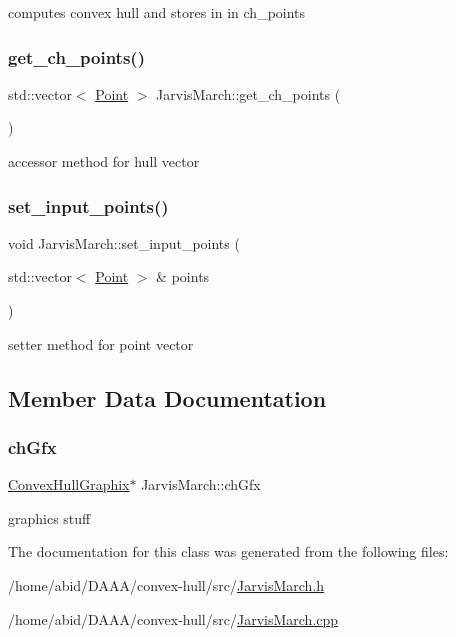 computes convex hull and stores in in ch\+\_\+points \mbox{\label{class_jarvis_march_ae07fa1d85d5be1e876baa79a0a15e6bf}} 
\subsubsection{\texorpdfstring{get\_ch\_points()}{get\_ch\_points()}}
{\footnotesize\ttfamily std\+::vector$<$ \mbox{\hyperlink{class_point}{Point}} $>$ Jarvis\+March\+::get\+\_\+ch\+\_\+points (\begin{DoxyParamCaption}{ }\end{DoxyParamCaption})}

accessor method for hull vector \mbox{\label{class_jarvis_march_a53ff2d27872fa533efb2ce222a9dde88}} 
\subsubsection{\texorpdfstring{set\_input\_points()}{set\_input\_points()}}
{\footnotesize\ttfamily void Jarvis\+March\+::set\+\_\+input\+\_\+points (\begin{DoxyParamCaption}\item[{std\+::vector$<$ \mbox{\hyperlink{class_point}{Point}} $>$ \&}]{points }\end{DoxyParamCaption})}

setter method for point vector 

\subsection{Member Data Documentation}
\mbox{\label{class_jarvis_march_a6fb3af00dde6115578e1accc2e8b953c}} 
\subsubsection{\texorpdfstring{chGfx}{chGfx}}
{\footnotesize\ttfamily \mbox{\hyperlink{class_convex_hull_graphix}{Convex\+Hull\+Graphix}}$\ast$ Jarvis\+March\+::ch\+Gfx}

graphics stuff 

The documentation for this class was generated from the following files\+:\begin{DoxyCompactItemize}
\item 
/home/abid/\+D\+A\+A\+A/convex-\/hull/src/\mbox{\hyperlink{_jarvis_march_8h}{Jarvis\+March.\+h}}\item 
/home/abid/\+D\+A\+A\+A/convex-\/hull/src/\mbox{\hyperlink{_jarvis_march_8cpp}{Jarvis\+March.\+cpp}}\end{DoxyCompactItemize}
